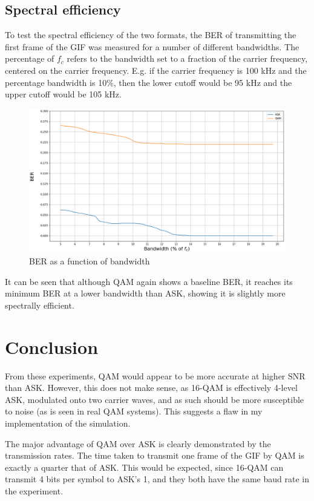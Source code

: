 \documentclass{article}
\begin{document}
\subsection{Spectral efficiency}
To test the spectral efficiency of the two formats, the BER of transmitting the first frame of the GIF was measured for a number of different bandwidths. The percentage of $f_c$ refers to the bandwidth set to a fraction of the carrier frequency, centered on the carrier frequency. E.g. if the carrier frequency is 100 kHz and the percentage bandwidth is 10\%, then the lower cutoff would be 95 kHz and the upper cutoff would be 105 kHz.

\noindent
\begin{figure}[h]
    \begin{center}
        \includegraphics[width=0.7\linewidth]{figures/bandwidth.png}
    \end{center}
    \caption{BER as a function of bandwidth}
\end{figure}

It can be seen that although QAM again shows a baseline BER, it reaches its minimum BER at a lower bandwidth than ASK, showing it is slightly more spectrally efficient. 

\section{Conclusion}
From these experiments, QAM would appear to be more accurate at higher SNR than ASK. However, this does not make sense, as 16-QAM is effectively 4-level ASK, modulated onto two carrier waves, and as such should be more susceptible to noise (as is seen in real QAM systems). This suggests a flaw in my implementation of the simulation.

The major advantage of QAM over ASK is clearly demonstrated by the transmission rates. The time taken to transmit one frame of the GIF by QAM is exactly a quarter that of ASK. This would be expected, since 16-QAM can transmit 4 bits per symbol to ASK's 1, and they both have the same baud rate in the experiment.  
\end{document}

